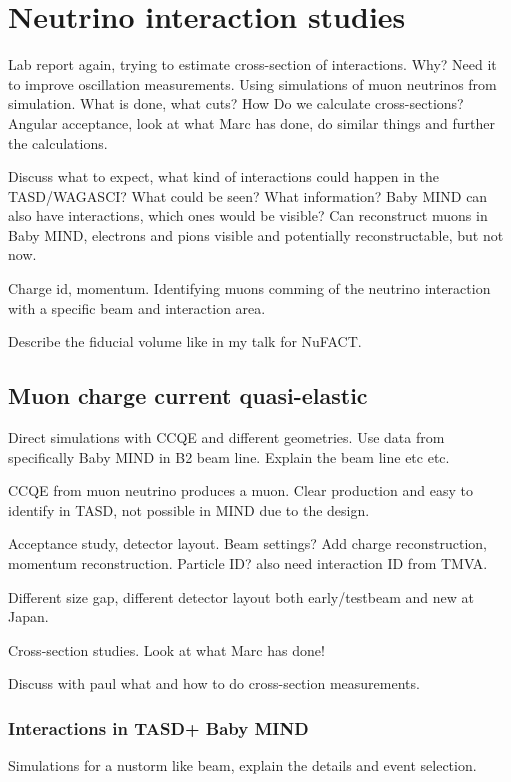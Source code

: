 \chapter{Neutrino interaction studies}
\label{c:neutrino}

Lab report again, trying to estimate cross-section of interactions. Why? Need it to improve oscillation measurements. Using simulations of muon neutrinos from simulation. What is done, what cuts? How Do we calculate cross-sections? Angular acceptance, look at what Marc has done, do similar things and further the calculations.

Discuss what to expect, what kind of interactions could happen in the TASD/WAGASCI? What could be seen? What information? Baby MIND can also have interactions, which ones would be visible? Can reconstruct muons in Baby MIND, electrons and pions visible and potentially reconstructable, but not now.


Charge id, momentum. Identifying muons comming of the neutrino interaction with a specific beam and interaction area.

Describe the fiducial volume like in my talk for NuFACT.

\section{Muon charge current quasi-elastic}

Direct simulations with CCQE and different geometries. Use data from specifically Baby MIND in B2 beam line. Explain the beam line etc etc.

CCQE from muon neutrino produces a muon. Clear production and easy to identify in TASD, not possible in MIND due to the design. 



Acceptance study, detector layout. Beam settings? Add charge reconstruction, momentum reconstruction. Particle ID? also need interaction ID from TMVA.

Different size gap, different detector layout both early/testbeam and new at Japan.


Cross-section studies. Look at what Marc has done! 

Discuss with paul what and how to do cross-section measurements.

\subsection{Interactions in TASD+ Baby MIND}
Simulations for a nustorm like beam, explain the details and event selection.

